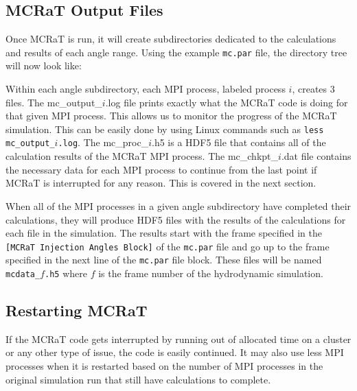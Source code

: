 \documentclass[12pt,a4paper]{article}
\begin{document}
 \subsection{MCRaT Output Files}
 Once MCRaT is run, it will create subdirectories dedicated to the calculations and results of each angle range. Using the example \texttt{mc.par} file, the directory tree will now look like: 
 
 \begin{figure}[h!]
 \end{figure}
 
 Within each angle subdirectory, each MPI process, labeled process $i$, creates 3 files. The mc\_output\_$i$.log file prints exactly what the MCRaT code is doing for that given MPI process. This allows us to monitor the progress of the MCRaT simulation. This can be easily done by using Linux commands such as \texttt{less mc\_output\_$i$.log}. The mc\_proc\_$i$.h5 is a HDF5 file that contains all of the calculation results of the MCRaT MPI process. The mc\_chkpt\_$i$.dat file contains the necessary data for each MPI process to continue from the last point if MCRaT is interrupted for any reason. This is covered in the next section.
 
 When all of the MPI processes in a given angle subdirectory have completed their calculations, they will produce HDF5 files with the results of the calculations for each file in the simulation. The results start with the frame specified in the \texttt{[MCRaT Injection Angles Block]} of the \texttt{mc.par} file and go up to the frame specified in the next line of the \texttt{mc.par} file block. These files will be named \texttt{mcdata\_$f$.h5} where $f$ is the frame number of the hydrodynamic simulation.
 
 \subsection{Restarting MCRaT}
 If the MCRaT code gets interrupted by running out of allocated time on a cluster or any other type of issue, the code is easily continued. It may also use less MPI processes when it is restarted based on the number of MPI processes in the original simulation run that still have calculations to complete. 
 
\end{document}
